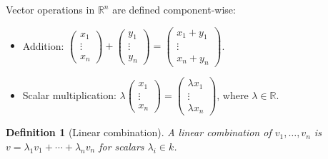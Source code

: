 \documentclass{article}
\newtheorem{definition}{Definition}
\begin{document}
Vector operations in $\mathbb{R}^n$ are defined component-wise:
\begin{itemize}
    \item Addition: $\begin{pmatrix}x_1\\\vdots\\x_n\end{pmatrix} + \begin{pmatrix}y_1\\\vdots\\y_n\end{pmatrix} = \begin{pmatrix}x_1+y_1\\\vdots\\x_n+y_n\end{pmatrix}$.
    \item Scalar multiplication: $\lambda\begin{pmatrix}x_1\\\vdots\\x_n\end{pmatrix} = \begin{pmatrix}\lambda x_1\\\vdots\\\lambda x_n\end{pmatrix}$, where $\lambda \in \mathbb{R}$.
\end{itemize}
\begin{definition}[Linear combination]
    A linear combination of $v_1,\ldots,v_n$ is $v = \lambda_1v_1+\cdots+\lambda_nv_n$ for scalars $\lambda_i \in k$.
\end{definition}
\end{document}
